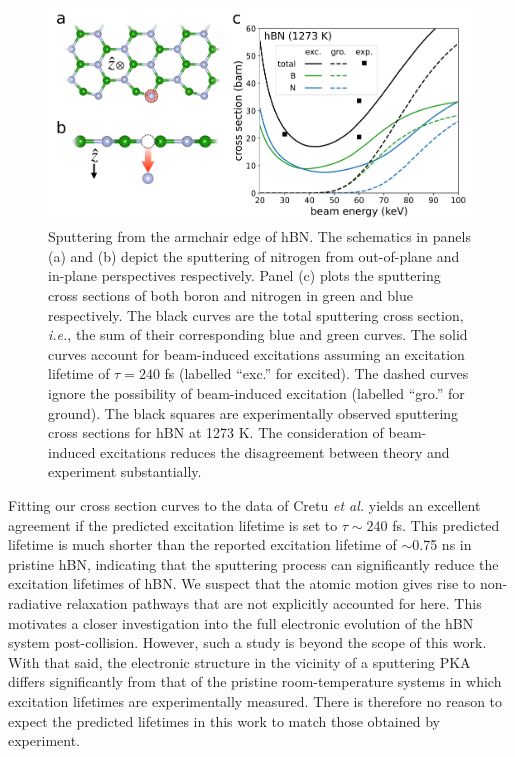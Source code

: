 \documentclass{article}
\begin{document}
\begin{figure} 
  \centering
  \includegraphics[width=\textwidth]{figures/edgeCross.pdf}
  \caption{
    Sputtering from the armchair edge of hBN.
    The schematics in panels (a) and (b) depict the sputtering of nitrogen from
    out-of-plane and in-plane perspectives respectively.
    Panel (c) plots the sputtering cross sections of both boron and nitrogen in
    green and blue respectively.
    The black curves are the total sputtering cross section, \textit{i.e.}, the sum of
    their corresponding blue and green curves.
    The solid curves account for beam-induced excitations assuming an
    excitation lifetime of $\tau=240$ fs (labelled ``exc.'' for excited).
    The dashed curves ignore the possibility of beam-induced excitation
    (labelled ``gro.'' for ground).
    The black squares are experimentally observed sputtering cross sections
    for hBN at 1273 K.\cite{Cretu2015}
    The consideration of beam-induced excitations reduces the disagreement
    between theory and experiment substantially.
  }
  \label{fig:edgeCross}
\end{figure}

Fitting our cross section curves to the data of Cretu \textit{et al.} yields an
excellent agreement if the predicted excitation lifetime is set to $\tau \sim
240$ fs.
This predicted lifetime is much shorter than the reported excitation lifetime
of $\sim$0.75 ns in pristine hBN,\cite{Li2016b} indicating that the sputtering
process can significantly reduce the excitation lifetimes of hBN.
We suspect that the atomic motion gives rise to non-radiative relaxation
pathways that are not explicitly accounted for here. 
This motivates a closer investigation into the full electronic evolution of
the hBN system post-collision.
However, such a study is beyond the scope of this work.
With that said, the electronic structure in the vicinity of a sputtering PKA
differs significantly from that of the pristine room-temperature systems in
which excitation lifetimes are experimentally measured.
There is therefore no reason to expect the predicted lifetimes in this
work to match those obtained by experiment.
\end{document}
